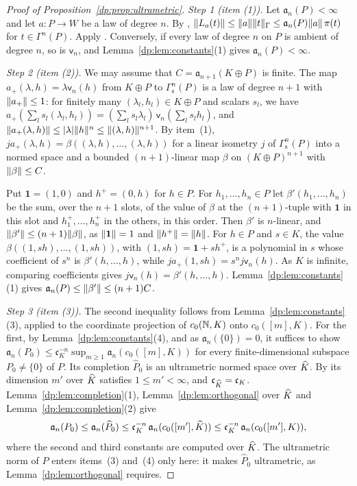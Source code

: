 \begin{proof}[Proof of Proposition~\ref{dp:prop:ultrametric}]
\emph{Step 1 (item (1)).} Let $\mathfrak a_n(P)<\infty$ and let $a\colon P\to W$ be a law of degree $n$. By \cite[Lemma~Q.1(1)]{I}, $\lVert L_a(t)\rVert\le\lVert a\rVert\lVert t\rVert_\Gamma\le\mathfrak a_n(P)\lVert a\rVert\,\pi(t)$ for $t\in\Gamma^n(P)$. Apply \cite[Lemma~Q.1(4)]{I}. Conversely, if every law of degree $n$ on $P$ is ambient of degree $n$, so is $\mathsf v_n$, and Lemma~\ref{dp:lem:constants}(1) gives $\mathfrak a_n(P)<\infty$.

\emph{Step 2 (item (2)).} We may assume that $C=\mathfrak a_{n+1}(K\oplus P)$ is finite. The map $a_+(\lambda,h)=\lambda\mathsf v_n(h)$ from $K\oplus P$ to $\Gamma^n_{\mathrm s}(P)$ is a law of degree $n+1$ with $\lVert a_+\rVert\le1$: for finitely many $(\lambda_l,h_l)\in K\oplus P$ and scalars $s_l$, we have $a_+(\sum_ls_l(\lambda_l,h_l))=(\sum_ls_l\lambda_l)\,\mathsf v_n(\sum_ls_lh_l)$, and $\lVert a_+(\lambda,h)\rVert\le\lvert \lambda\rvert\lVert h\rVert^n\le\lVert (\lambda,h)\rVert^{n+1}$. By item~(1), $ja_+(\lambda,h)=\beta((\lambda,h),\dots,(\lambda,h))$ for a linear isometry $j$ of $\Gamma^n_{\mathrm s}(P)$ into a normed space and a bounded $(n+1)$\nobreakdash-linear map $\beta$ on $(K\oplus P)^{n+1}$ with $\lVert \beta\rVert\le C$.

Put $\mathbf 1=(1,0)$ and $h^+=(0,h)$ for $h\in P$. For $h_1,\dots,h_n\in P$ let $\beta'(h_1,\dots,h_n)$ be the sum, over the $n+1$ slots, of the value of $\beta$ at the $(n+1)$\nobreakdash-tuple with $\mathbf 1$ in this slot and $h_1^+,\dots,h_n^+$ in the others, in this order. Then $\beta'$ is $n$\nobreakdash-linear, and $\lVert \beta'\rVert\le(n+1)\lVert \beta\rVert$, as $\lVert \mathbf 1\rVert=1$ and $\lVert h^+\rVert=\lVert h\rVert$. For $h\in P$ and $s\in K$, the value $\beta((1,sh),\dots,(1,sh))$, with $(1,sh)=\mathbf 1+sh^+$, is a polynomial in $s$ whose coefficient of $s^n$ is $\beta'(h,\dots,h)$, while $ja_+(1,sh)=s^nj\mathsf v_n(h)$. As $K$ is infinite, comparing coefficients gives $j\mathsf v_n(h)=\beta'(h,\dots,h)$. Lemma~\ref{dp:lem:constants}(1) gives $\mathfrak a_n(P)\le\lVert \beta'\rVert\le(n+1)C$.

\emph{Step 3 (item (3)).} The second inequality follows from Lemma~\ref{dp:lem:constants}(3), applied to the coordinate projection of $c_0(\mathbb N,K)$ onto $c_0([m],K)$. For the first, by Lemma~\ref{dp:lem:constants}(4), and as $\mathfrak a_n(\{0\})=0$, it suffices to show $\mathfrak a_n(P_0)\le\mathfrak c_K^{-n}\sup_{m\ge1}\mathfrak a_n(c_0([m],K))$ for every finite-dimensional subspace $P_0\ne\{0\}$ of $P$. Its completion $\widehat P_0$ is an ultrametric normed space over $\widehat K$. By \cite[Lemma~Q.13(2)]{I} its dimension $m'$ over $\widehat K$ satisfies $1\le m'<\infty$, and $\mathfrak c_{\widehat K}=\mathfrak c_K$. Lemma~\ref{dp:lem:completion}(1), Lemma~\ref{dp:lem:orthogonal} over $\widehat K$ and Lemma~\ref{dp:lem:completion}(2) give
\[
 \mathfrak a_n(P_0)\le\mathfrak a_n(\widehat P_0)\le\mathfrak c_K^{-n}\,\mathfrak a_n(c_0([m'],\widehat K))
 \le\mathfrak c_K^{-n}\,\mathfrak a_n(c_0([m'],K)),
\]
where the second and third constants are computed over $\widehat K$. The ultrametric norm of $P$ enters items~(3) and~(4) only here: it makes $\widehat P_0$ ultrametric, as Lemma~\ref{dp:lem:orthogonal} requires.


\end{proof}

